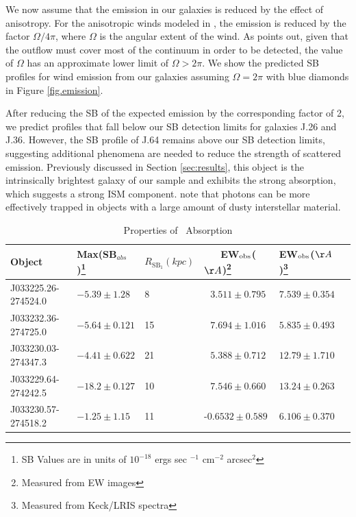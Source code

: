 \documentclass[twocolumn]{aastex61}
\begin{document}
We now assume that the emission in our galaxies is reduced by the effect of anisotropy. 
For the anisotropic winds modeled in \cite{Prochaska_2011}, the emission is reduced by the factor $\Omega/4\pi$, where $\Omega$ is the angular extent of the wind. 
As \citet{Prochaska_2011} points out, given that the outflow must cover most of the continuum in order to be detected, the value of $\Omega$ has an approximate lower limit of $\Omega > 2\pi$. 
We show the predicted SB profiles for wind emission from our galaxies assuming  $\Omega = 2\pi$ with blue diamonds in Figure  \ref{fig.emission}.

After reducing the SB of the expected  emission by the corresponding factor of 2, we predict profiles that fall below our SB detection limits for galaxies J.26 and J.36. However, the SB profile of J.64 remains above our SB detection limits, suggesting additional phenomena are needed to reduce the strength of scattered emission. Previously discussed in Section \ref{sec:results}, this object is the intrinsically brightest galaxy of our sample and exhibits the strong  absorption, which suggests a strong ISM component. \cite{Prochaska_2011} note that  photons can be more effectively trapped in objects with a large amount of dusty interstellar material.


\begin{table}[]
\centering
\caption{Properties of \ Absorption\label{tab:abs_props}}  
\begin{tabular}{llllll} \hline \hline
Object & Max(SB$_{abs}$)\footnote{SB Values are in units of $10^{-18}$ ergs sec $^{-1}$ cm$^{-2}$ arcsec$^2$} & $R_{\text{SB}_1}(kpc)$ &\ \ \ EW$_{\rm{obs}}$($\AA$)\footnote{ Measured from EW images} & EW$_{\rm{obs}}$($\AA$)\footnote{Measured from Keck/LRIS spectra}  \\  \hline
J033225.26-274524.0 &  $-5.39 \pm 1.28 $ & 8 &     $\ \ \ 3.511 \pm 0.795$ & $7.539 \pm 0.354 $\\
J033232.36-274725.0 &  $-5.64 \pm 0.121 $ & 15 & $\ \ \ 7.694 \pm 1.016$ & $5.835 \pm 0.493$\\
J033230.03-274347.3 &  $-4.41 \pm 0.622 $ & 21 & $\ \ \ 5.388 \pm 0.712$ & $12.79 \pm 1.710$\\
J033229.64-274242.5 &  $-18.2 \pm 0.127 $ & 10 & $\ \ \ 7.546 \pm 0.660$ & $13.24 \pm 0.263$\\
J033230.57-274518.2 &  $-1.25 \pm 1.15   $ & 11& -$0.6532 \pm 0.589$ & $6.106 \pm 0.370$\\ \hline
\end{tabular}
\end{table}
\end{document}

